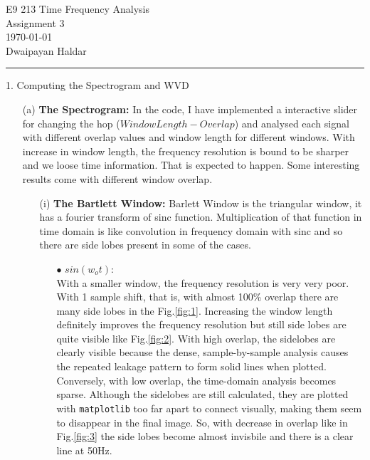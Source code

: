 \documentclass[12pt,a4paper,onecolumn]{exam}
\newcommand{\questionheader}[1]{%
  \begin{tcolorbox}[
    enhanced,
    colback=black,
    coltext=white,
    boxrule=0pt,              
    fontupper=\Large\bfseries, 
    arc=4mm                   
  ]
  #1 
  \end{tcolorbox}%
}
\begin{document}
\begingroup  
    \centering
    \LARGE E9 213 Time Frequency Analysis\\
    \LARGE Assignment 3\\[0.5em]
    \large \today\\[0.5em]
    \large Dwaipayan Haldar\par
\endgroup
\noindent\rule{\textwidth}{0.5pt}
\printanswers
\renewcommand{\solutiontitle}{\noindent\textbf{Ans:}\enspace}

\questionheader{1. Computing the Spectrogram and WVD}
\begin{solution}
  \begin{itemize}
    \item[(a)] \textbf{The Spectrogram:} 
    In the code, I have implemented a interactive slider for changing the hop ($Window Length - Overlap$) and analysed each signal with different      overlap values and window length for different windows. With increase in window length, the frequency resolution is bound to be sharper and we loose time information. That is expected to happen. Some interesting results come with different window overlap. 
    \begin{itemize}
      \item[(i)] \textbf{The Bartlett Window:}
      Barlett Window is the triangular window, it has a fourier transform of sinc function. Multiplication of that function in time domain is like convolution in frequency domain with sinc and so there are side lobes present in some of the cases. 
      \begin{itemize}

        \item[$\bullet$] $sin(w_ot)$:\\
        With a smaller window, the frequency resolution is very very poor. With 1 sample shift, that is, with almost 100\% overlap there are many side lobes in the Fig.\ref{fig:1}. Increasing the window length definitely improves the frequency resolution but still side lobes are quite visible like Fig.\ref{fig:2}. With high overlap, the sidelobes are clearly visible because the dense, sample-by-sample analysis causes the repeated leakage pattern to form solid lines when plotted. Conversely, with low overlap, the time-domain analysis becomes sparse. Although the sidelobes are still calculated, they are plotted with \verb|matplotlib| too far apart to connect visually, making them seem to disappear in the final image. So, with decrease in overlap like in Fig.\ref{fig:3} the side lobes become almost invisbile and there is a clear line at 50Hz.
      

\end{itemize}
\end{itemize}
\end{itemize}
\end{solution}
\end{document}
